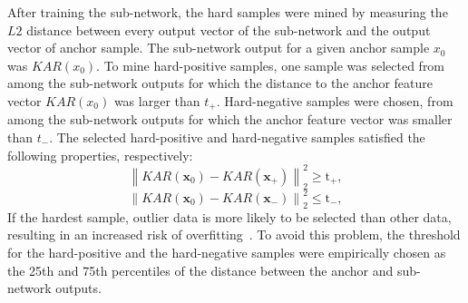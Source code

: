 After training the sub-network, the hard samples were mined by measuring the $L2$ distance between every output vector of the sub-network and the output vector of anchor sample.
The sub-network output for a given anchor sample $x_0$ was $KAR(x_0)$. To mine hard-positive samples, one sample was selected from among the sub-network outputs for which the distance to the anchor feature vector $KAR(x_0)$ was larger than $t_+$. Hard-negative samples were chosen, from among the sub-network outputs for which the anchor feature vector was smaller than $t_-$.
The selected hard-positive and hard-negative samples satisfied the following properties, respectively:
\begin{equation}
    {\left\| {{KAR\left(\mathbf{x}_{0}\right)} - {KAR\left(\mathbf{x}_{+}\right)}} \right\|_2^2} \geq \mathrm{t}_{+}, 
    \label{thres_pos}
\end{equation}
\begin{equation}
    {\left\| {{KAR\left(\mathbf{x}_{0}\right)} - {KAR\left(\mathbf{x}_{-}\right)}} \right\|_2^2} \leq \mathrm{t}_{-},\label{thres_neg}
\end{equation}
If the hardest sample, outlier data is more likely to be selected than other data, resulting in an increased risk of overfitting~\cite{schroff2015facenet}.
To avoid this problem, the threshold for the hard-positive and the hard-negative samples were empirically chosen as the 25th and 75th percentiles of the distance between the anchor and sub-network outputs.

